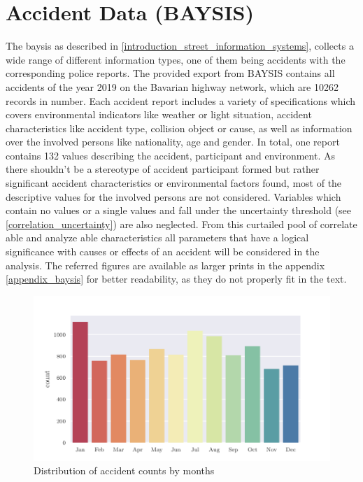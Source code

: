 \section{Accident Data (BAYSIS)}
\label{dataset_baysis}
The \acrfull{baysis} as described in \cref{introduction_street_information_systems}, collects a wide range of different information types, one of them being accidents with the corresponding police reports. The provided export from BAYSIS contains all accidents of the year 2019 on the Bavarian highway network, which are 10262 records in number. Each accident report includes a variety of specifications which covers environmental indicators like weather or light situation, accident characteristics like accident type, collision object or cause, as well as information over the involved persons like nationality, age and gender. In total, one report contains 132 values describing the accident, participant and environment. As there shouldn't be a stereotype of accident participant formed but rather significant accident characteristics or environmental factors found, most of the descriptive values for the involved persons are not considered. Variables which contain no values or a single values and fall under the uncertainty threshold (see \cref{correlation_uncertainty}) are also neglected. From this curtailed pool of correlate able and analyze able characteristics all parameters that have a logical significance with causes or effects of an accident will be considered in the analysis. The referred figures are available as larger prints in the appendix \cref{appendix_baysis} for better readability, as they do not properly fit in the text. 
\begin{figure}[ht]
	\centering
	\includegraphics[scale=0.9]{CorrAnalysis/data/BAYSIS/01_dataset/plots/baysis_dataset_hist_month}
	\caption{Distribution of accident counts by months}
	\label{img:baysis_dataset_dist_month}
\end{figure}
